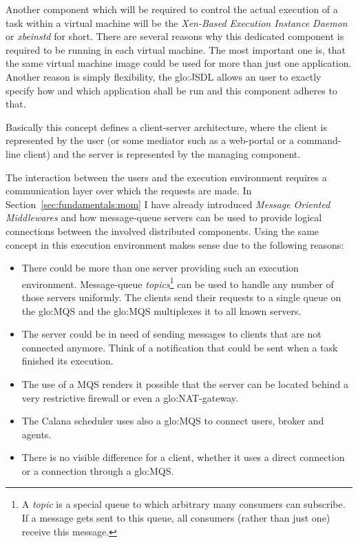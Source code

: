 Another component which  will be required to control  the actual execution
of a task  within a virtual machine will  be the \emph{Xen-Based Execution
  Instance Daemon} or \emph{xbeinstd} for short. There are several reasons
why this  dedicated component  is required to  be running in  each virtual
machine. The  most important one is,  that the same  virtual machine image
could  be used  for more  than just  one application.   Another  reason is
simply flexibility,  the \gls{glo:JSDL} allows an user  to exactly specify
how and which application shall be run and this component adheres to that.

\bigskip

Basically  this concept  defines a  client-server architecture,  where the
client is represented  by the user (or some mediator  such as a web-portal
or a  command-line client) and the  server is represented  by the managing
component.

The interaction between the users and the execution environment requires a
communication   layer   over   which    the   requests   are   made.    In
Section~\ref{sec:fundamentals:mom} I have already introduced \emph{Message
  Oriented  Middlewares} and  how  message-queue servers  can  be used  to
provide logical  connections between the  involved distributed components.
Using the  same concept in this  execution environment makes  sense due to
the following reasons:

\begin{itemize}
\item  There could be  more than  one server  providing such  an execution
  environment.   Message-queue \emph{topics}\footnote{A \emph{topic}  is a
    special queue to  which arbitrary many consumers can  subscribe.  If a
    message gets sent to this  queue, all consumers (rather than just one)
    receive  this message.}  can  be used  to handle  any number  of those
  servers uniformly. The clients send  their requests to a single queue on
  the  \gls{glo:MQS} and  the \gls{glo:MQS}  multiplexes it  to  all known
  servers.
\item The server could be in  need of sending messages to clients that are
  not connected anymore. Think of a notification that could be sent when a
  task finished its execution.
\item The use of a MQS renders  it possible that the server can be located
  behind a very restrictive firewall or even a \gls{glo:NAT}-gateway.
\item The  Calana scheduler  uses also a  \gls{glo:MQS} to  connect users,
  broker and agents.
\item  There is  no visible  difference for  a client,  whether it  uses a
  direct connection or a connection through a \gls{glo:MQS}.
\end{itemize}

